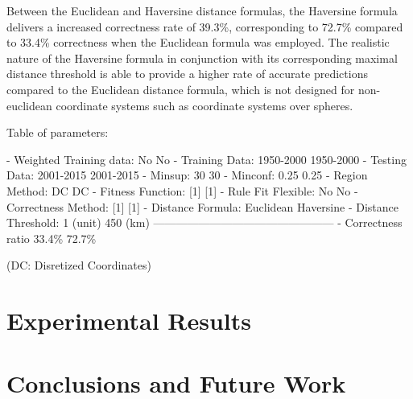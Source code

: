 \documentclass[conference]{IEEEtran}
\begin{document}
Between the Euclidean and Haversine distance formulas, the Haversine formula delivers a increased correctness rate of 39.3\%, corresponding to 72.7\% compared to 33.4\% correctness when the Euclidean formula was employed. The realistic nature of the Haversine formula in conjunction with its corresponding maximal distance threshold is able to provide a higher rate of accurate predictions compared to the Euclidean distance formula, which is not designed for non-euclidean coordinate systems such as coordinate systems over spheres.

Table of parameters:

- Weighted Training data:   No         No
- Training Data:            1950-2000  1950-2000
- Testing Data:             2001-2015  2001-2015
- Minsup:                   30         30
- Minconf:                  0.25       0.25
- Region Method:            DC         DC
- Fitness Function:         [1]        [1]
- Rule Fit Flexible:        No         No
- Correctness Method:       [1]        [1]
- Distance Formula:         Euclidean  Haversine
- Distance Threshold:       1 (unit)   450 (km)
------------------------------------------------
- Correctness ratio         33.4\%     72.7\%

(DC: Disretized Coordinates)




\section{Experimental Results}

\section{Conclusions and Future Work} %

\begin{thebibliography}{1}
\bibitem{} 
\bibitem{} 
\bibitem{} 
\bibitem{} 
\bibitem{} 
\bibitem{} 
\bibitem{} 
\bibitem{} 
\bibitem{} 
\bibitem{} 
\end{thebibliography}
\end{document}
